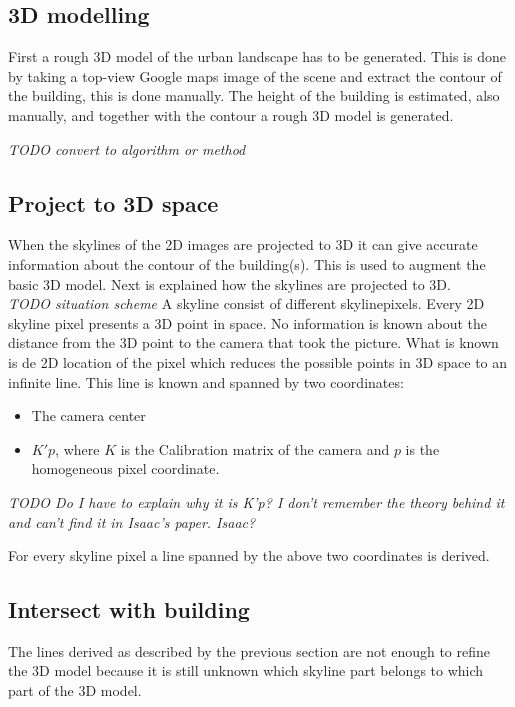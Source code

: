 \documentclass[10pt]{article}
\begin{document}
   \subsection{3D modelling}
First a rough 3D model of the urban landscape has to be generated. This is done
by taking a top-view Google maps image of the scene and extract the contour of
the building, this is done manually. 
The height of the building is estimated, also manually, and together with the
contour a rough 3D model is generated. 




\textit{TODO convert to algorithm or method }
\subsection{Project to 3D space}
When the skylines of the 2D images are projected to 3D it can give 
accurate information about the contour of the building(s). This is used to
augment the basic 3D model.  Next is explained how the skylines are projected to
3D.\\

\textit{TODO situation scheme}
A skyline consist of different skylinepixels. Every 2D skyline pixel presents a 3D point in space. No
information is known about the distance from the 3D point to the camera that
took the picture. What is known is de 2D location of the pixel which reduces the possible points in 3D
space to an infinite line.  This line is known and spanned by two 
coordinates:\\ 
\begin{itemize}
	\item The camera center %
	\item $K'p$, where $K$ is the Calibration matrix of the camera and $p$ is the homogeneous pixel coordinate.
\end{itemize}

\textit{ TODO Do I have to explain why it is K'p? I don't remember the theory behind it and can't find it in
Isaac's paper. Isaac? }

For every skyline pixel a line spanned by the above two coordinates is derived.


\subsection{Intersect with building}
The lines derived as described by the previous section are not enough to refine
the 3D model because it is still unknown which skyline part belongs to which
part of the 3D model.
\end{document}
